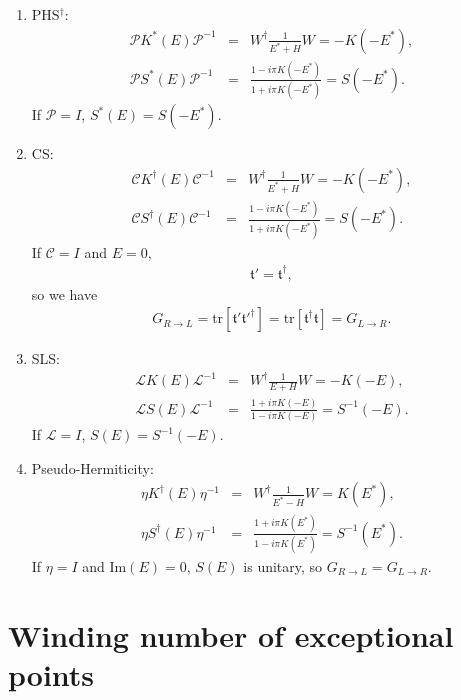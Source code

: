 \documentclass[aps,pra,reprint,superscriptaddress,showkeys,amsmath,amssymb,longbibliography]{revtex4-1}
\begin{document}
\begin{enumerate}
\item PHS$^{\dagger}$:
  \begin{eqnarray}
    \mathcal{P}K^*(E)\mathcal{P}^{-1}&=&W^{\dagger}\frac{1}{E^{*}+H}W=-K(-E^{*}),\\
    \mathcal{P}S^*(E)\mathcal{P}^{-1}&=&\frac{1-i\pi K(-E^*)}{1+i\pi K(-E^*)}=S(-E^*).
  \end{eqnarray}
  If $\mathcal{P}=I$, $S^*(E)=S(-E^*)$.

\item CS:
  \begin{eqnarray}
    \mathcal{C}K^{\dagger}(E)\mathcal{C}^{-1}&=&
                                                 W^{\dagger}\frac{1}{E^*+H}W=-K(-E^*),\\
    \mathcal{C}S^{\dagger}(E)\mathcal{C}^{-1}&=&\frac{1-i\pi K(-E^*)}{1+i\pi K(-E^*)}=S(-E^*).
  \end{eqnarray}
  If $\mathcal{C}=I$ and $E=0$,
  \begin{eqnarray}
    \mathfrak{t}'=\mathfrak{t}^\dagger,
  \end{eqnarray}
  so we have 
  \begin{eqnarray}
    G_{R\rightarrow L}=\text{tr}[\mathfrak{t}'\mathfrak{t}'^\dagger]=\text{tr}[\mathfrak{t}^\dagger \mathfrak{t}]=G_{L\rightarrow R}.
  \end{eqnarray}

\item SLS:
  \begin{eqnarray}
    \mathcal{L}K(E)\mathcal{L}^{-1} &=&
                                        W^\dagger \frac{1}{E+H}W=-K(-E),\\
    \mathcal{L}S(E)\mathcal{L}^{-1} &=&
                                        \frac{1+i\pi K(-E)}{1-i\pi K(-E)}=S^{-1}(-E).
  \end{eqnarray}
  If $\mathcal{L}=I$, $S(E)=S^{-1}(-E)$.

\item Pseudo-Hermiticity:
  \begin{eqnarray}
    \eta K^{\dagger}(E)\eta^{-1}&=&W^\dagger\frac{1}{E^*-H}W=K(E^*),\\
    \eta S^\dagger(E)\eta^{-1}&=&\frac{1+i\pi K(E^*)}{1-i\pi K(E^*)}=S^{-1}(E^*).
  \end{eqnarray}
  If $\eta=I$ and $\text{Im}(E)=0$, $S(E)$ is unitary, so $G_{R\rightarrow L}=G_{L\rightarrow R}$.

\end{enumerate}

\section{Winding number of exceptional points}
\label{app:winding}
\end{document}
